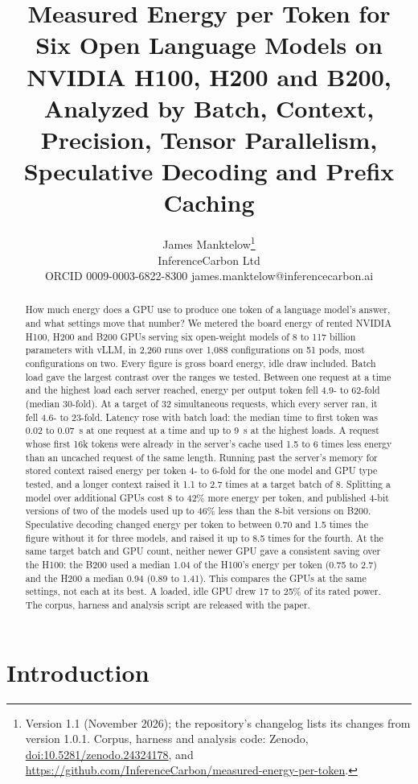 \documentclass[11pt]{article}
\title{Measured Energy per Token for Six Open Language Models on NVIDIA H100, H200 and B200,\\Analyzed by Batch, Context, Precision, Tensor Parallelism, Speculative Decoding and Prefix Caching}
\author{James Manktelow\thanks{Version 1.1 (November 2026); the repository's changelog lists its changes from version 1.0.1. Corpus, harness and analysis code: Zenodo, \href{https://doi.org/10.5281/zenodo.24324178}{doi:10.5281/zenodo.24324178}, and \url{https://github.com/InferenceCarbon/measured-energy-per-token}.}\\InferenceCarbon Ltd\\\small ORCID 0009-0003-6822-8300 \quad james.manktelow@inferencecarbon.ai}
\date{}
\begin{document}
\maketitle

\begin{abstract}
How much energy does a GPU use to produce one token of a language model's answer, and what settings move that number? We metered the board energy of rented NVIDIA H100, H200 and B200 GPUs serving six open-weight models of 8 to 117 billion parameters with vLLM, in 2,260 runs over 1,088 configurations on 51 pods, most configurations on two. Every figure is gross board energy, idle draw included. Batch load gave the largest contrast over the ranges we tested. Between one request at a time and the highest load each server reached, energy per output token fell 4.9- to 62-fold (median 30-fold). At a target of 32 simultaneous requests, which every server ran, it fell 4.6- to 23-fold. Latency rose with batch load: the median time to first token was 0.02 to 0.07~s at one request at a time and up to 9~s at the highest loads. A request whose first 16k tokens were already in the server's cache used 1.5 to 6 times less energy than an uncached request of the same length. Running past the server's memory for stored context raised energy per token 4- to 6-fold for the one model and GPU type tested, and a longer context raised it 1.1 to 2.7 times at a target batch of 8. Splitting a model over additional GPUs cost 8 to 42\% more energy per token, and published 4-bit versions of two of the models used up to 46\% less than the 8-bit versions on B200. Speculative decoding changed energy per token to between 0.70 and 1.5 times the figure without it for three models, and raised it up to 8.5 times for the fourth. At the same target batch and GPU count, neither newer GPU gave a consistent saving over the H100: the B200 used a median 1.04 of the H100's energy per token (0.75 to 2.7) and the H200 a median 0.94 (0.89 to 1.41). This compares the GPUs at the same settings, not each at its best. A loaded, idle GPU drew 17 to 25\% of its rated power. The corpus, harness and analysis script are released with the paper.
\end{abstract}

\section{Introduction}\label{sec:intro}
\end{document}
